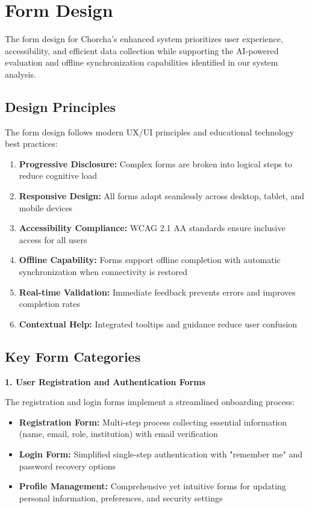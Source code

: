 \documentclass[12pt,a4paper,oneside]{book}
\begin{document}
\section{Form Design}

The form design for Chorcha's enhanced system prioritizes user experience, accessibility, and efficient data collection while supporting the AI-powered evaluation and offline synchronization capabilities identified in our system analysis.

\subsection{Design Principles}

The form design follows modern UX/UI principles and educational technology best practices:

\begin{enumerate}
    \item \textbf{Progressive Disclosure:} Complex forms are broken into logical steps to reduce cognitive load
    \item \textbf{Responsive Design:} All forms adapt seamlessly across desktop, tablet, and mobile devices
    \item \textbf{Accessibility Compliance:} WCAG 2.1 AA standards ensure inclusive access for all users
    \item \textbf{Offline Capability:} Forms support offline completion with automatic synchronization when connectivity is restored
    \item \textbf{Real-time Validation:} Immediate feedback prevents errors and improves completion rates
    \item \textbf{Contextual Help:} Integrated tooltips and guidance reduce user confusion
\end{enumerate}

\subsection{Key Form Categories}

\textbf{1. User Registration and Authentication Forms}

The registration and login forms implement a streamlined onboarding process:

\begin{itemize}
    \item \textbf{Registration Form:} Multi-step process collecting essential information (name, email, role, institution) with email verification
    \item \textbf{Login Form:} Simplified single-step authentication with "remember me" and password recovery options
    \item \textbf{Profile Management:} Comprehensive yet intuitive forms for updating personal information, preferences, and security settings
\end{itemize}
\end{document}
